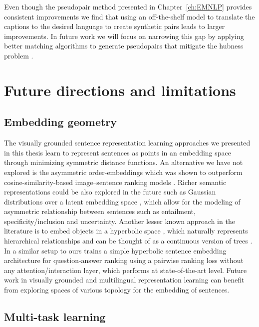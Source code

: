 Even though the pseudopair method presented in Chapter~\ref{ch:EMNLP} provides consistent improvements
we find that using an off-the-shelf model to translate the captions to the desired language to create 
synthetic pairs leads to larger improvements. In future work we will focus on narrowing this gap by applying
better matching algorithms to generate pseudopairs that mitigate the hubness problem \citep{radovanovic2010existence,tomavsev2011influence,tomavsev2011probabilistic,dinu2014improving}. 

 

\section{Future directions and limitations}

\subsection{Embedding geometry}

The visually grounded sentence representation learning approaches 
we presented in this thesis learn to represent sentences as points
in an embedding space through minimizing symmetric distance functions. 
An alternative we have not explored is the asymmetric order-embeddings 
\citep{vendrov2016order} which was shown to outperform cosine-similarity-based 
image--sentence ranking models \citep{faghri2017vse++}. 
Richer semantic representations could be also explored in the future such as Gaussian 
distributions over a latent embedding 
space \citep{vilnis2014word}, which allow for the modeling of asymmetric relationship between sentences
such as entailment, specificity/inclusion and uncertainty. 
Another lesser known approach in the literature is to embed objects in a
hyperbolic space \citep{nickel2017poincare}, which naturally represents hierarchical relationships and 
can be thought of as a continuous version of trees \citep{krioukov2010hyperbolic}. 
In a similar setup to ours \cite{tay2018hyperbolic} 
trains a simple hyperbolic sentence embedding architecture for question-answer 
ranking using a pairwise ranking loss without any attention/interaction layer, 
which performs at state-of-the-art level.
Future work in visually grounded and multilingual representation learning can benefit from exploring
spaces of various topology for the embedding of sentences. 



\subsection{Multi-task learning}


